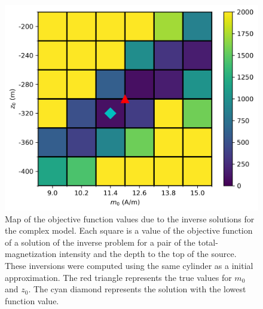 \begin{figure}
	\centering
	\includegraphics[scale=.75]{figures/complex_obj_func_map.png}
	\caption{Map of the objective function values due to the inverse solutions for the complex model. Each square is a value of the objective function of a solution of the inverse problem for a pair of the total-magnetization intensity and the depth to the top of the source. These inversions were computed using the same cylinder as a initial approximation. The red triangle represents the true values for $m_0$ and $z_0$. The cyan diamond represents the solution with the lowest function value.
	}
	\label{fig:complex_map}
\end{figure}

